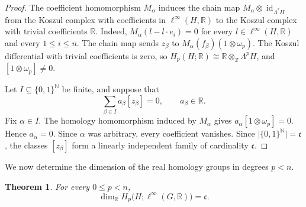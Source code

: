 \documentclass[pdflatex,sn-mathphys-num]{sn-jnl}%
\theoremstyle{plain}
\newtheorem{theorem}{Theorem}[section]
\theoremstyle{remark}
\theoremstyle{definition}
\numberwithin{equation}{section}
\begin{document}
\begin{proof}
The coefficient homomorphism \( M_\alpha \) induces the chain map \( M_\alpha\otimes\operatorname{id}_{\Lambda^*H} \) from the Koszul complex with coefficients in \( \ell^\infty(H,\mathbb R) \) to the Koszul complex with trivial coefficients \( \mathbb R \). Indeed, \( M_\alpha(l-l\cdot e_i)=0 \) for every \( l\in\ell^\infty(H,\mathbb R) \) and every \( 1\leq i\leq n \). The chain map sends \( z_\beta \) to \( M_\alpha(f_\beta)(1\otimes\omega_p) \). The Koszul differential with trivial coefficients is zero, so \( H_p(H;\mathbb R)\cong\mathbb R\otimes_{\mathbb Z}\Lambda^pH \), and \( [1\otimes\omega_p]\neq0 \).

Let \( I\subseteq\{0,1\}^{\mathbb N} \) be finite, and suppose that
\[
\sum_{\beta\in I}
a_\beta[z_\beta]
=
0,
\qquad
a_\beta\in\mathbb R.
\]
Fix \( \alpha\in I \). The homology homomorphism induced by \( M_\alpha \) gives \( a_\alpha[1\otimes\omega_p]=0 \). Hence \( a_\alpha=0 \). Since \( \alpha \) was arbitrary, every coefficient vanishes. Since \( \lvert\{0,1\}^{\mathbb N}\rvert=\mathfrak c \), the classes \( [z_\beta] \) form a linearly independent family of cardinality \( \mathfrak c \).
\end{proof}

We now determine the dimension of the real homology groups in degrees \( p<n \).

\begin{theorem}
\label{thm:lower-real-homology-dimension}
For every \( 0\leq p<n \),
\[
\dim_{\mathbb R}
H_p\bigl(H;\ell^\infty(G,\mathbb R)\bigr)
=
\mathfrak c.
\]
\end{theorem}
\end{document}
